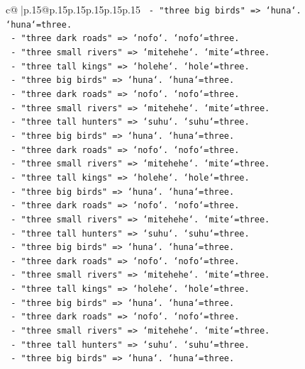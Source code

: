\documentclass{article}
\begin{document}
{\begin{supertabular}{c@{$\;$}|p{.15\linewidth}@{}p{.15\linewidth}p{.15\linewidth}p{.15\linewidth}p{.15\linewidth}p{.15\linewidth}}
{{{\texttt{      {-} "three big birds" => `huna`. `huna`=three.} \\
\texttt{      {-} "three dark roads" => `nofo`. `nofo`=three.} \\
\texttt{      {-} "three small rivers" => `mitehehe`. `mite`=three.} \\
\texttt{      {-} "three tall kings" => `holehe`. `hole`=three.} \\
\texttt{      {-} "three big birds" => `huna`. `huna`=three.} \\
\texttt{      {-} "three dark roads" => `nofo`. `nofo`=three.} \\
\texttt{      {-} "three small rivers" => `mitehehe`. `mite`=three.} \\
\texttt{      {-} "three tall hunters" => `suhu`. `suhu`=three.} \\
\texttt{      {-} "three big birds" => `huna`. `huna`=three.} \\
\texttt{      {-} "three dark roads" => `nofo`. `nofo`=three.} \\
\texttt{      {-} "three small rivers" => `mitehehe`. `mite`=three.} \\
\texttt{      {-} "three tall kings" => `holehe`. `hole`=three.} \\
\texttt{      {-} "three big birds" => `huna`. `huna`=three.} \\
\texttt{      {-} "three dark roads" => `nofo`. `nofo`=three.} \\
\texttt{      {-} "three small rivers" => `mitehehe`. `mite`=three.} \\
\texttt{      {-} "three tall hunters" => `suhu`. `suhu`=three.} \\
\texttt{      {-} "three big birds" => `huna`. `huna`=three.} \\
\texttt{      {-} "three dark roads" => `nofo`. `nofo`=three.} \\
\texttt{      {-} "three small rivers" => `mitehehe`. `mite`=three.} \\
\texttt{      {-} "three tall kings" => `holehe`. `hole`=three.} \\
\texttt{      {-} "three big birds" => `huna`. `huna`=three.} \\
\texttt{      {-} "three dark roads" => `nofo`. `nofo`=three.} \\
\texttt{      {-} "three small rivers" => `mitehehe`. `mite`=three.} \\
\texttt{      {-} "three tall hunters" => `suhu`. `suhu`=three.} \\
\texttt{      {-} "three big birds" => `huna`. `huna`=three.} \\
}}}
\end{supertabular}}
\end{document}

